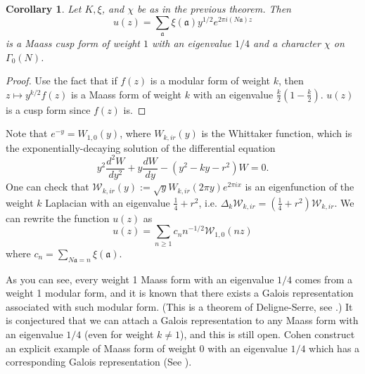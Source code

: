 \documentclass{article}
\newtheorem{corollary}{Corollary}
\begin{document}
\begin{corollary}
Let $K, \xi$, and $\chi$ be as in the previous theorem. Then 
$$
u(z) = \sum_{\mathfrak{a}} \xi(\mathfrak{a}) y^{1/2}e^{2\pi i (N\mathfrak{a}) z}
$$
is a Maass cusp form of weight $1$ with an eigenvalue $1/4$ and a character $\chi$ on $\Gamma_{0}(N)$. 
\begin{comment}
Here $W_{k/2, ir}(z)$ is the Whittaker function, which is the exponentially-decaying solution of the differential equation 
$$
y^{2}\frac{d^{2}W_{k/2, ir}}{dy^{2}} + y\frac{dW_{k/2, ir}}{dy} - (y^{2} - ky - r^{2}) W_{k/2, ir} = 0
$$
\end{comment}
\end{corollary}
\begin{proof}
Use the fact that if $f(z)$ is a modular form of weight $k$, then $z\mapsto y^{k/2}f(z)$ is a Maass form of weight $k$ with an eigenvalue $\frac{k}{2}\left(1-\frac{k}{2}\right)$. $u(z)$ is a cusp form since $f(z)$ is. 
\end{proof}
Note that $e^{-y} = W_{1, 0}(y)$, where $W_{k, ir}(y)$ is the Whittaker function, which is the exponentially-decaying solution of the differential equation 
$$
y^{2}\frac{d^{2}W}{dy^{2}} + y\frac{dW}{dy} - (y^{2} - ky - r^{2}) W = 0.
$$
One can check that $\mathcal{W}_{k, ir}(y):= \sqrt{y}W_{k, ir}(2\pi  y)e^{2\pi i  x}$ is an eigenfunction of the weight $k$ Laplacian with an eigenvalue $\frac{1}{4} + r^{2}$, i.e. $\Delta_{k}\mathcal{W}_{k, ir} = (\frac{1}{4} + r^{2})\mathcal{W}_{k, ir}$. We can rewrite the function $u(z)$ as 
$$
u(z) = \sum_{n\geq 1} c_{n}n^{-1/2}\mathcal{W}_{1, 0}(nz)
$$
where $c_{n} = \sum_{N\mathfrak{a} = n} \xi(\mathfrak{a})$. 

As you can see, every weight 1 Maass form with an eigenvalue $1/4$ comes from a weight 1 modular form, and it is known that there exists a Galois representation associated with such modular form. (This is a theorem of Deligne-Serre, see \cite{del}.) 
It is conjectured that we can attach a Galois representation to  any Maass form with an eigenvalue $1/4$ (even for weight $k\neq 1$), and this is still open. 
Cohen construct an explicit example of Maass form of weight 0 with an eigenvalue $1/4$ which has a corresponding Galois representation (See \cite{coh}). 
\end{document}
